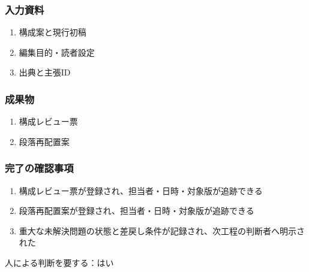 \documentclass[a4paper,11pt]{article}
\begin{document}
\subsubsection*{入力資料}
\begin{enumerate}[leftmargin=2em,itemsep=0.35em]
\item 構成案と現行初稿
\item 編集目的・読者設定
\item 出典と主張ID
\end{enumerate}
\subsubsection*{成果物}
\begin{enumerate}[leftmargin=2em,itemsep=0.35em]
\item 構成レビュー票
\item 段落再配置案
\end{enumerate}
\subsubsection*{完了の確認事項}
\begin{enumerate}[leftmargin=2em,itemsep=0.35em]
\item 構成レビュー票が登録され、担当者・日時・対象版が追跡できる
\item 段落再配置案が登録され、担当者・日時・対象版が追跡できる
\item 重大な未解決問題の状態と差戻し条件が記録され、次工程の判断者へ明示された
\end{enumerate}
\par 人による判断を要する：はい\par\medskip
\end{document}
